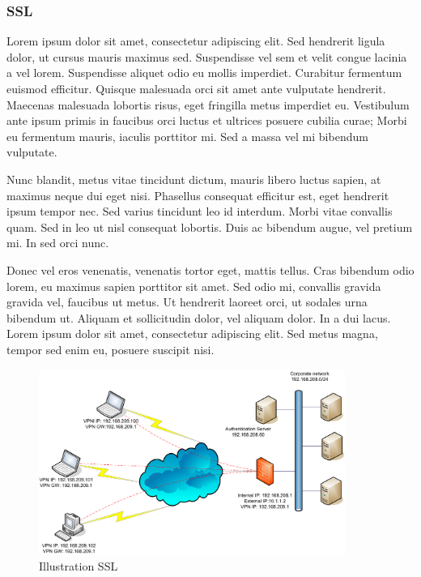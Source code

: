 \documentclass{report}
\begin{document}
\subsubsection{SSL}


\setlength{\columnseprule}{0.1cm}
\begin{multicols}{2}
Lorem ipsum dolor sit amet, consectetur adipiscing elit. Sed hendrerit ligula dolor, ut cursus mauris maximus sed. Suspendisse vel sem et velit congue lacinia a vel lorem. Suspendisse aliquet odio eu mollis imperdiet. Curabitur fermentum euismod efficitur. Quisque malesuada orci sit amet ante vulputate hendrerit. Maecenas malesuada lobortis risus, eget fringilla metus imperdiet eu. Vestibulum ante ipsum primis in faucibus orci luctus et ultrices posuere cubilia curae; Morbi eu fermentum mauris, iaculis porttitor mi. Sed a massa vel mi bibendum vulputate.

Nunc blandit, metus vitae tincidunt dictum, mauris libero luctus sapien, at maximus neque dui eget nisi. Phasellus consequat efficitur est, eget hendrerit ipsum tempor nec. Sed varius tincidunt leo id interdum. Morbi vitae convallis quam. Sed in leo ut nisl consequat lobortis. Duis ac bibendum augue, vel pretium mi. In sed orci nunc.

Donec vel eros venenatis, venenatis tortor eget, mattis tellus. Cras bibendum odio lorem, eu maximus sapien porttitor sit amet. Sed odio mi, convallis gravida gravida vel, faucibus ut metus. Ut hendrerit laoreet orci, ut sodales urna bibendum ut. Aliquam et sollicitudin dolor, vel aliquam dolor. In a dui lacus. Lorem ipsum dolor sit amet, consectetur adipiscing elit. Sed metus magna, tempor sed enim eu, posuere suscipit nisi.
\end{multicols}

\begin{figure}[!h]
\centering
\includegraphics[width=10cm]{./images/images/illustrationssl}
\caption{Illustration SSL}
\end{figure}
\end{document}
